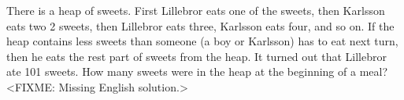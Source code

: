 \problem
There is a heap of sweets.
First Lillebror eats one of the sweets, then Karlsson eats two 2 sweets, then
Lillebror eats three, Karlsson eats four, and so on.
If the heap contains less sweets than someone (a boy or Karlsson) has to eat
next turn, then he eats the rest part of sweets from the heap.
It turned out that Lillebror ate 101 sweets.
How many sweets were in the heap at the beginning of a meal?
\solution
<FIXME: Missing English solution.>
\endproblem
